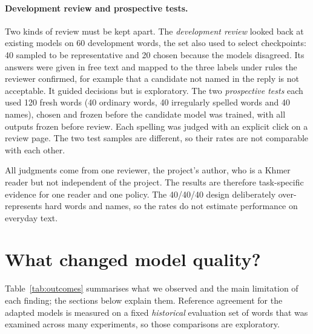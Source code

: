 \documentclass[10pt,a4paper,twocolumn]{article}
\begin{document}
\paragraph{Development review and prospective tests.}
Two kinds of review must be kept apart. The \emph{development review} looked back at existing models on 60
development words, the set also used to select checkpoints: 40 sampled to be representative and 20 chosen because
the models disagreed. Its answers were
given in free text and mapped to the three labels under rules the reviewer confirmed, for example that a candidate
not named in the reply is not acceptable. It guided decisions but is exploratory. The two \emph{prospective tests}
each used 120 fresh words (40 ordinary words, 40 irregularly spelled words and 40 names), chosen and frozen
before the candidate model was trained, with all outputs frozen before review. Each spelling was judged with an
explicit click on a review page. The two test samples are different, so their rates are not comparable with each
other.

All judgments come from one reviewer, the project's author, who is a Khmer reader but not independent of the
project. The results are therefore task-specific evidence for one reader and one policy. The 40/40/40 design
deliberately over-represents hard words and names, so the rates do not estimate performance on everyday text.

\section{What changed model quality?}
\label{sec:results}

Table~\ref{tab:outcomes} summarises what we observed and the main limitation of each finding; the sections below
explain them. Reference agreement for the adapted models is measured on a fixed \emph{historical} evaluation set of
 words that was examined across many experiments, so those comparisons are exploratory.
\end{document}
